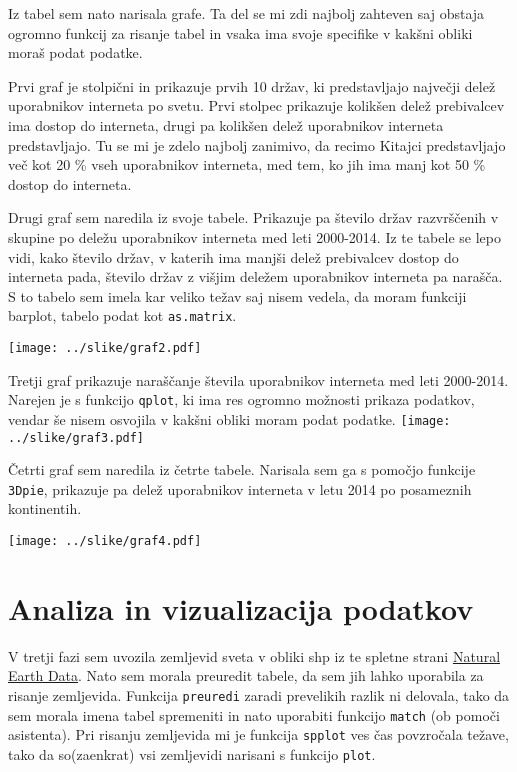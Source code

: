 \documentclass[11pt,a4paper]{article}
\begin{document}
Iz tabel sem nato narisala grafe. Ta del se mi zdi najbolj zahteven saj obstaja ogromno funkcij za risanje tabel in vsaka ima svoje specifike v kakšni obliki moraš podat podatke.

\-
Prvi graf je stolpični in prikazuje prvih 10 držav, ki predstavljajo največji delež uporabnikov interneta po svetu. Prvi stolpec prikazuje kolikšen delež prebivalcev ima dostop do interneta, drugi pa kolikšen delež uporabnikov interneta predstavljajo. Tu se mi je zdelo najbolj zanimivo, da recimo Kitajci predstavljajo več kot 20 \% vseh uporabnikov interneta, med tem, ko jih ima manj kot 50 \% dostop do interneta.



\newpage
Drugi graf sem naredila iz svoje tabele. Prikazuje pa število držav razvrščenih v skupine po deležu uporabnikov interneta med leti 2000-2014. Iz te tabele se lepo vidi, kako število držav, v katerih ima manjši delež prebivalcev dostop do interneta pada, število držav z višjim deležem uporabnikov interneta pa narašča.
S to tabelo sem imela kar veliko težav saj nisem vedela, da moram funkciji barplot, tabelo podat kot \verb|as.matrix|.

\texttt{[image: ../slike/graf2.pdf]}

\newpage
Tretji graf prikazuje naraščanje števila uporabnikov interneta med leti 2000-2014. Narejen je s funkcijo \verb|qplot|, ki ima res ogromno možnosti prikaza podatkov, vendar še nisem osvojila v kakšni obliki moram podat podatke. 
\-
\texttt{[image: ../slike/graf3.pdf]}

\newpage
Četrti graf sem naredila iz četrte tabele. Narisala sem ga s pomočjo funkcije \verb|3Dpie|, prikazuje pa delež uporabnikov interneta v letu 2014 po posameznih kontinentih.

\texttt{[image: ../slike/graf4.pdf]}

\newpage


\section{Analiza in vizualizacija podatkov}
V tretji fazi sem uvozila zemljevid sveta v obliki shp iz te spletne strani \href{http://www.naturalearthdata.com/http//www.naturalearthdata.com/download/50m/cultural/ne_50m_admin_0_countries.zip}{Natural Earth Data}. Nato sem morala preuredit tabele, da sem jih lahko uporabila za risanje zemljevida. Funkcija \verb|preuredi| zaradi prevelikih razlik ni delovala, tako da sem morala imena tabel spremeniti in nato uporabiti funkcijo \verb|match| (ob pomoči asistenta). Pri risanju zemljevida mi je funkcija \verb|spplot| ves čas povzročala težave, tako da so(zaenkrat) vsi zemljevidi narisani s funkcijo \verb|plot|. 
\end{document}
